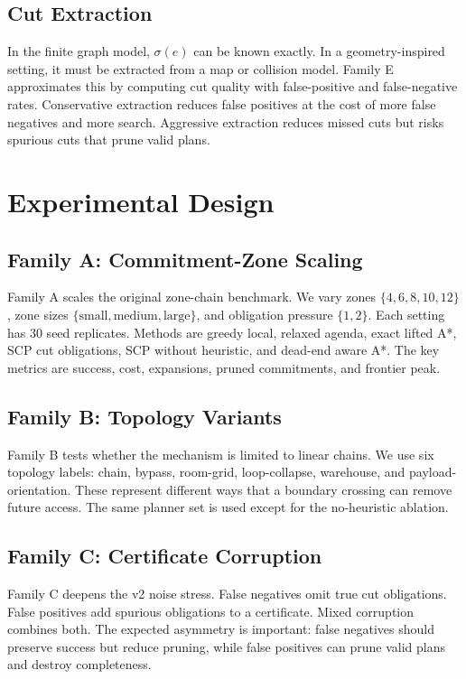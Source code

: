 \documentclass{article}
\newcommand{\survive}{\sigma}
\begin{document}
\subsection{Cut Extraction}

In the finite graph model, $\survive(e)$ can be known exactly. In a geometry-inspired setting, it must be extracted from a map or collision model. Family E approximates this by computing cut quality with false-positive and false-negative rates. Conservative extraction reduces false positives at the cost of more false negatives and more search. Aggressive extraction reduces missed cuts but risks spurious cuts that prune valid plans.

\section{Experimental Design}

\subsection{Family A: Commitment-Zone Scaling}

Family A scales the original zone-chain benchmark. We vary zones $\{4,6,8,10,12\}$, zone sizes $\{\text{small},\text{medium},\text{large}\}$, and obligation pressure $\{1,2\}$. Each setting has 30 seed replicates. Methods are greedy local, relaxed agenda, exact lifted A*, SCP cut obligations, SCP without heuristic, and dead-end aware A*. The key metrics are success, cost, expansions, pruned commitments, and frontier peak.

\subsection{Family B: Topology Variants}

Family B tests whether the mechanism is limited to linear chains. We use six topology labels: chain, bypass, room-grid, loop-collapse, warehouse, and payload-orientation. These represent different ways that a boundary crossing can remove future access. The same planner set is used except for the no-heuristic ablation.

\subsection{Family C: Certificate Corruption}

Family C deepens the v2 noise stress. False negatives omit true cut obligations. False positives add spurious obligations to a certificate. Mixed corruption combines both. The expected asymmetry is important: false negatives should preserve success but reduce pruning, while false positives can prune valid plans and destroy completeness.
\end{document}
